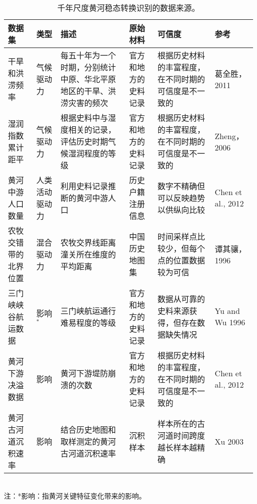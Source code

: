 \begin{table}[!htbp]
  \caption[千年尺度黄河稳态转换识别的数据来源]{千年尺度黄河稳态转换识别的数据来源。}
    \begin{tabularx}{\textwidth}{ p{2cm} L p{5cm} L p{3cm} L}
    \toprule
    数据集   & 类型    & 描述    & 原始材料  & 可信度   & 参考 \\
    \midrule
    干旱和洪涝频率 & 气候驱动力 & 每五十年为一个时期，分别统计中原、华北平原地区的干旱、洪涝灾害的频次 & 官方和地方的史料记录 & 根据历史材料的丰富程度，在不同时期的可信度是不一致的 & 葛全胜，2011 \cite{GeQuanSheng2011} \\
    湿润指数累计距平 & 气候驱动力 & 根据史料中与湿度相关的记录，评估历史时期气候湿润程度的等级 & 官方和地方的史料记录 & 根据历史材料的丰富程度，在不同时期的可信度是不一致的 & Zheng，2006 \cite{zheng2006} \\
    黄河中游人口数量 & 人类活动驱动力 & 利用史料记录推断的黄河中游人口 & 历史户籍注册信息 & 数字不精确但可以反映趋势以供纵向比较 & Chen et al., 2012 \cite{chen2012} \\
    农牧交错带的北界位置 & 混合驱动力 & 农牧交界线距离潼关所在维度的平均距离 & 中国历史地图集 & 时间采样点比较少，但每个点的位置数据较为可信 & 谭其骧，1996 \cite{TanQiXiang1996} \\
    三门峡峡谷航运数据 & 影响$^*$    & 三门峡航运通行难易程度的等级 & 官方和地方的史料记录 & 数据从可靠的史料来源获得，但存在数据缺失情况 & Yu and Wu 1996 \\ %
    黄河下游决溢数据 & 影响    & 黄河下游堤防崩溃的次数 & 官方和地方的史料记录 & 根据历史材料的丰富程度，在不同时期的可信度是不一致的 & Chen et al., 2012 \cite{chen2012} \\
    黄河古河道沉积速率 & 影响    & 结合历史地图和取样测定的黄河古河道沉积速率 & 沉积样本  & 样本所在的古河道时间跨度越长样本越精确 & Xu 2003 \cite{xu2003a} \\
    \bottomrule
  \end{tabularx}\\[2pt]
  \footnotesize 注：*影响：指黄河关键特征变化带来的影响。\\
  \label{tab:data_source}%
\end{table}%
